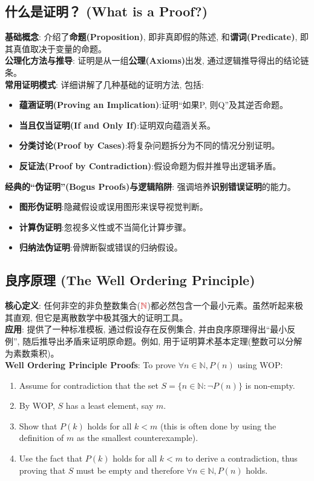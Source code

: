 \documentclass[12pt, a4paper, UTF8]{ctexart}
\newcommand{\term}[1]{\textbf{\textcolor{blue!80!black}{#1}}}
\newcommand{\emphb}[1]{\textbf{#1}}
\newcommand{\mhl}[1]{\textcolor{red!80!black}{#1}}
\begin{document}
\begin{sloppypar}
    \subsection{什么是证明？ (What is a Proof?)}
    \emphb{基础概念}: 介绍了\term{命题(Proposition)}, 即非真即假的陈述, 和\term{谓词(Predicate)}, 即其真值取决于变量的命题。\\
    \emphb{公理化方法与推导}: 证明是从一组\term{公理(Axioms)}出发, 通过逻辑推导得出的结论链条。\\
    \emphb{常用证明模式}: 详细讲解了几种基础的证明方法, 包括:
    \begin{itemize}[nosep]
        \item \term{蕴涵证明(Proving an Implication)}:证明“如果P, 则Q”及其逆否命题。
        \item \term{当且仅当证明(If and Only If)}:证明双向蕴涵关系。
        \item \term{分类讨论(Proof by Cases)}:将复杂问题拆分为不同的情况分别证明。
        \item \term{反证法(Proof by Contradiction)}:假设命题为假并推导出逻辑矛盾。
    \end{itemize}
    \emphb{经典的“伪证明”(Bogus Proofs)与逻辑陷阱}: 强调培养\emphb{识别错误证明}的能力。
    \begin{itemize}[nosep]
        \item \emphb{图形伪证明}:隐藏假设或误用图形来误导视觉判断。
        \item \emphb{计算伪证明}:忽视多义性或不当简化计算步骤。
        \item \emphb{归纳法伪证明}:骨牌断裂或错误的归纳假设。
    \end{itemize}

    \subsection{良序原理 (The Well Ordering Principle)}
    \emphb{核心定义}: 任何非空的非负整数集合($\mhl{\mathbb{N}}$)都必然包含一个最小元素。虽然听起来极其直观, 但它是离散数学中极其强大的证明工具。\\
    \emphb{应用}: 提供了一种标准模板, 通过假设存在反例集合, 并由良序原理得出“最小反例”, 随后推导出矛盾来证明原命题。例如, 用于证明算术基本定理(整数可以分解为素数乘积)。\\
    \emphb{Well Ordering Principle Proofs}: To prove $\forall n \in \mathbb{N}, P(n)$ using WOP:
    \begin{enumerate}[nosep]
        \item Assume for contradiction that the set $S = \{ n \in \mathbb{N} : \neg P(n) \}$ is non-empty.
        \item By WOP, $S$ has a least element, say $m$.
        \item Show that $P(k)$ holds for all $k < m$ (this is often done by using the definition of $m$ as the smallest counterexample).
        \item Use the fact that $P(k)$ holds for all $k < m$ to derive a contradiction, thus proving that $S$ must be empty and therefore $\forall n \in \mathbb{N}, P(n)$ holds.
    \end{enumerate}


\end{sloppypar}
\end{document}
